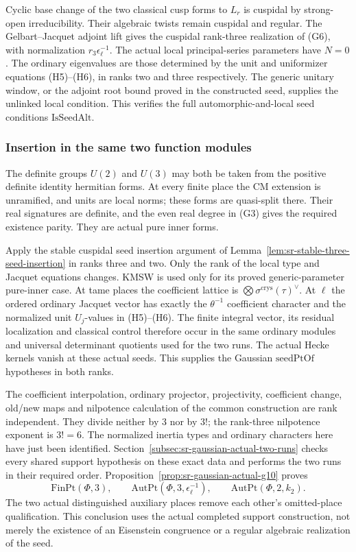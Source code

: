 Cyclic base change of the two classical cusp forms
to \(L_r\) is cuspidal by strong-open irreducibility.
Their algebraic twists remain cuspidal and regular.
The Gelbart--Jacquet adjoint lift gives the cuspidal
rank-three realization of (G6), with normalization
\(r_3\epsilon_\ell^{-1}\).
The actual local principal-series parameters have
\(N=0\).
The ordinary eigenvalues are those determined by
the unit and uniformizer equations (H5)--(H6), in
ranks two and three respectively.
The generic unitary window, or the adjoint root bound
proved in the constructed seed, supplies the
unlinked local condition.
This verifies the full automorphic-and-local seed
conditions \(\mathrm{IsSeedAlt}\).

\subsubsection{Insertion in the same two function modules}
The definite groups \(U(2)\) and \(U(3)\) may both be
taken from the positive definite identity hermitian forms.
At every finite place the CM extension is unramified,
and units are local norms; these forms are quasi-split
there.
Their real signatures are definite, and the even
real degree in (G3) gives the required existence parity.
They are actual pure inner forms.

Apply the stable cuspidal seed insertion argument of
Lemma~\ref{lem:sr-stable-three-seed-insertion} in ranks
three and two.
Only the rank of the local type and Jacquet equations
changes.
KMSW is used only for its proved generic-parameter
pure-inner case.
At tame places the coefficient lattice is
\(\bigotimes\sigma^{\mathrm{crys}}(\tau)^\vee\).
At \(\ell\) the ordered ordinary Jacquet vector has
exactly the \(\theta^{-1}\) coefficient character and
the normalized unit \(U_j\)-values in (H5)--(H6).
The finite integral vector, its residual localization
and classical control therefore occur in the same
ordinary modules and universal determinant quotients
used for the two runs.
The actual Hecke kernels vanish at these actual seeds.
This supplies the Gaussian \(\mathrm{seedPtOf}\)
hypotheses in both ranks.

The coefficient interpolation, ordinary projector,
projectivity, coefficient change, old/new maps and
nilpotence calculation of the common construction
are rank independent.
They divide neither by \(3\) nor by \(3!\);
the rank-three nilpotence exponent is \(3!=6\).
The normalized inertia types and ordinary characters
here have just been identified.
Section~\ref{subsec:sr-gaussian-actual-two-runs}
checks every shared support hypothesis on these exact
data and performs the two runs in their required order.
Proposition~\ref{prop:sr-gaussian-actual-g10} proves
\[
 \mathrm{FinPt}(\Phi,3),\qquad
 \mathrm{AutPt}(\Phi,3,\epsilon_\ell^{-1}),\qquad
 \mathrm{AutPt}(\Phi,2,k_2).
 \tag{G10}
\]
The two actual distinguished auxiliary places remove
each other's omitted-place qualification.
This conclusion uses the actual completed support
construction, not merely the existence of an Eisenstein
congruence or a regular algebraic realization of the seed.

